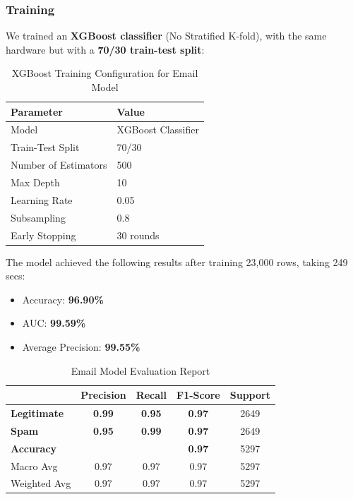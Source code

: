 \documentclass{article}
\begin{document}
\subsubsection*{Training}
We trained an \textbf{XGBoost classifier} (No Stratified K-fold), with the same hardware but with a \textbf{70/30 train-test split}:

\begin{table}[h!]
    \centering
    \renewcommand{\arraystretch}{1.2}
    \setlength{\tabcolsep}{11pt}
    \begin{tabular}{|l|l|}
        \hline
        \textbf{Parameter} & \textbf{Value} \\
        \hline
        Model & XGBoost Classifier \\
        \hline
        Train-Test Split & 70/30 \\
        \hline
        Number of Estimators & 500 \\
        \hline
        Max Depth & 10 \\
        \hline
        Learning Rate & 0.05 \\
        \hline
        Subsampling & 0.8 \\
        \hline
        Early Stopping & 30 rounds \\
        \hline
    \end{tabular}
    \caption{XGBoost Training Configuration for Email Model}
\end{table}

\newpage

\noindent
The model achieved the following results after training 23,000 rows, taking 249 secs:

\begin{itemize}
    \item Accuracy: \textbf{96.90\%}
    \item AUC: \textbf{99.59\%}
    \item Average Precision: \textbf{99.55\%}
\end{itemize}

\begin{table}[htbp]
    \centering
    \caption{Email Model Evaluation Report}
    \begin{tabular}{l c c c c}
    \toprule
     & \textbf{Precision} & \textbf{Recall} & \textbf{F1-Score} & Support \\
    \midrule
    \textbf{Legitimate} & \textbf{0.99} & \textbf{0.95} & \textbf{0.97} & 2649 \\
    \textbf{Spam} & \textbf{0.95} & \textbf{0.99} & \textbf{0.97} & 2649 \\
    \midrule
    \textbf{Accuracy}  & & & \textbf{0.97} & 5297 \\
    Macro Avg & 0.97 & 0.97 & 0.97 & 5297 \\
    Weighted Avg & 0.97 & 0.97 & 0.97 & 5297 \\
    \bottomrule
    \end{tabular}
    \label{tab:xgboost_evaluation}
\end{table}
\end{document}
